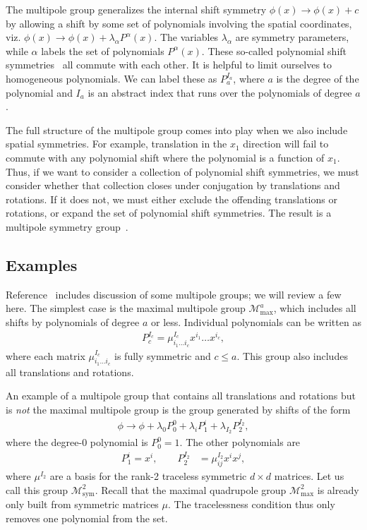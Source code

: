 \documentclass[pra,aps,twocolumn, amsfonts,amsmath,amssymb,nofootinbib,superscriptaddress]{revtex4-2}
\newcommand{\goesto}{\rightarrow}
\providecommand{\DIFaddend}{} %
\DeclareRobustCommand{\DIFaddend}{\DIFOaddend \let\includegraphics\DIFOincludegraphics} %
\begin{document}
 \DIFaddend The multipole group generalizes the internal shift symmetry $\phi(x) \goesto\phi (x) +c$ by allowing a shift by some set of polynomials involving the spatial coordinates, viz. $\phi (x) \goesto \phi (x) + \lambda_\alpha P^\alpha(x)$. The variables $\lambda_\alpha$ are symmetry parameters, while $\alpha$ labels the set of polynomials $P^\alpha(x)$. These so-called polynomial shift symmetries~\cite{Griffin2015} all commute with each other. It is helpful to limit ourselves to homogeneous polynomials. We can label these as $P_a^{I_a}$, where $a$ is the degree of the polynomial and $I_a$ is an abstract index that runs over the polynomials of degree $a$.

The full structure of the multipole group comes into play when we also include spatial symmetries. For example,  translation in the $x_1$ direction will fail to commute with any polynomial shift where the polynomial is a function of $x_1$. Thus, if we want to consider a collection of polynomial shift symmetries, we must consider whether that collection closes under conjugation by translations and rotations. If it does not, we must either exclude the offending translations or rotations, or expand the set of polynomial shift symmetries. The result is a multipole symmetry group~\cite{Gromov2019}.

\subsection{Examples} \label{sub:examples}

Reference~\cite{Gromov2019} includes discussion of some multipole groups; we will review a few here. The simplest case is the maximal multipole group $\mathcal{M}^a_\text{max}$, which includes all shifts by polynomials of degree $a$ or less. Individual polynomials can be written as
\begin{align}
P_c^{I_c} = \mu^{I_c}_{i_1\dots i_c}x^{i_1}\dots x^{i_c}, \label{eqn:basis}
\end{align}
where each  matrix  $\mu^{I_c}_{i_1\dots i_c}$ is fully symmetric and $c\le a$. This group also includes all translations and rotations.

An example of a multipole group that contains all translations and rotations but is \emph{not} the maximal multipole group is the group generated by shifts of the form
\begin{align}
\phi \goesto \phi + \lambda_0 P_0^0 + \lambda_{i} P^{i}_1 + \lambda_{I_2} P^{I_2}_2,
\end{align}
where the degree-0 polynomial is $P_0^0=1$. The other polynomials are
\begin{align}
P_1^{i} = x^i,\quad \quad P_2^{I_2} &= \mu^{I_2}_{ij} x^i x^j,
\end{align}
where $\mu^{I_2}$ are a basis for the rank-2 traceless symmetric $d\times d$ matrices. Let us call this group $\mathcal{M}^2_{\text{sym}}$. Recall that the maximal quadrupole group $\mathcal{M}^2_{\text{max}}$ is already only built from symmetric matrices $\mu$. The tracelessness condition thus only removes one polynomial from the set. 
\end{document}
